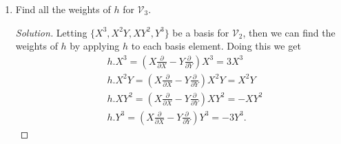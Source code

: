 \documentclass[12pt]{article}
\theoremstyle{definition}
\newenvironment{solution}
{\renewcommand\qedsymbol{$\blacksquare$}\begin{proof}[Solution]}
{\end{proof}}
\begin{document}
\begin{enumerate}
\begin{enumerate}
\begin{solution}
\begin{equation*}
\begin{split}
                                -Y\frac{\partial}{\partial Y}))u \\
                                &=\alpha (X\frac{\partial}{\partial
                                Y})u+\beta (Y\frac{\partial}{\partial
                                X})u+\gamma(X\frac{\partial}{\partial
                                X}-Y\frac{\partial}{\partial Y})u \\
                                &=\alpha(x.u)+\beta(y.u)+\gamma(h.u) \\
                                &=(\alpha_1+\alpha_2)(x.u)+(\beta_1+\beta_2)(y.u)+(\gamma_1+\gamma_2)(h.u)
                                \\
                                &= \alpha_1(x.u)+\beta_1(y.u)+\gamma_1(h.u) \\
                                &\quad\quad
                                +\alpha_2(x.u)+\beta_2(y.u)+\gamma_2(h.u),
                            \end{split}
                        \end{equation*}
                        which proves M1. REMINDER: Finish showing M2 and M3.
                    \end{solution}
                \item Find all the weights of $h$ for $\mathcal{V}_3$.
                    \begin{solution}
                        Letting $\{X^3, X^2Y, XY^2, Y^3\}$ be a basis for
                        $\mathcal{V}_2$, then we can find the weights of $h$ by
                        applying $h$ to each basis element. Doing this we get
                        \begin{equation*}
                            \begin{split}
                                &h.X^3=(X\frac{\partial}{\partial
                                X}-Y\frac{\partial}{\partial Y})X^3=3X^3 \\
                                &h.X^2Y=(X\frac{\partial}{\partial
                                X}-Y\frac{\partial}{\partial Y})X^2Y=X^2Y \\
                                &h.XY^2=(X\frac{\partial}{\partial
                                X}-Y\frac{\partial}{\partial Y})XY^2=-XY^2 \\
                                &h.Y^3=(X\frac{\partial}{\partial
                                X}-Y\frac{\partial}{\partial Y})Y^3=-3Y^3.
                            \end{split}

\end{equation*}
\end{solution}
\end{enumerate}
\end{enumerate}
\end{document}
